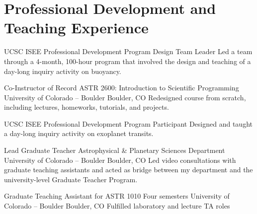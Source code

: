 \section{Professional Development and Teaching Experience}

		{UCSC ISEE Professional Development Program}
		{Design Team Leader}
		{}
		{}
		{Led a team through a 4-month, 100-hour program that involved the design and teaching of a day-long inquiry activity on buoyancy.}

		{Co-Instructor of Record}
		{ASTR 2600: Introduction to Scientific Programming}
		{University of Colorado -- Boulder}
		{Boulder, CO}
		{Redesigned course from scratch, including lectures, homeworks, tutorials, and projects.}

		{UCSC ISEE Professional Development Program}
		{Participant}
		{}
		{}
		{Designed and taught a day-long inquiry activity on exoplanet transits.}

		{Lead Graduate Teacher}
		{Astrophysical \& Planetary Sciences Department}
		{University of Colorado -- Boulder}
		{Boulder, CO}
		{Led video consultations with graduate teaching assistants and acted as bridge between my department and the university-level Graduate Teacher Program.}

		{Graduate Teaching Assistant for ASTR 1010}
		{Four semesters}
		{University of Colorado -- Boulder}
		{Boulder, CO}
		{Fulfilled laboratory and lecture TA roles}
